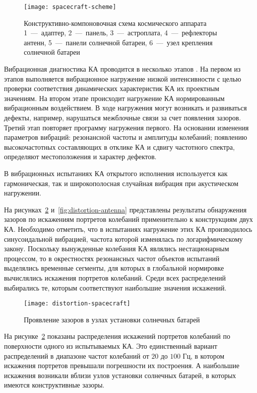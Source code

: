 \begin{figure}[H]
	\centerfloat
	\texttt{[image: spacecraft-scheme]}
	\caption{Конструктивно-компоновочная схема космического аппарата \\ 1~---~адаптер, 2~---~панель, 3~---~астроплата, 4~---~рефлекторы антенн, 5~---~панели солнечной батареи, 6~---~узел крепления солнечной батареи} \label{fig:spacecraft-scheme}
\end{figure}

Вибрационная диагностика КА проводится в несколько этапов \cite{lib:defects:Berns:experience}. На первом из этапов выполняется вибрационное нагружение низкой интенсивности с целью проверки соответствия динамических характеристик КА их проектным значениям. На втором этапе происходит нагружение КА нормированным вибрационным воздействием. В ходе нагружения могут возникать и развиваться дефекты, например, нарушаться межблочные связи за счет появления зазоров. Третий этап повторяет программу нагружения первого. На основании изменения параметров вибраций: резонансной частоты и амплитуды колебаний; появлению высокочастотных составляющих в отклике КА и сдвигу частотного спектра, определяют местоположения и характер дефектов.

В вибрационных испытаниях КА открытого исполнения используется как гармоническая, так и широкополосная случайная вибрация при акустическом нагружении.

На рисунках~\ref{fig:distortion-spacecraft} и~\ref{fig:distortion-antenna} представлены результаты обнаружения зазоров по искажениям портретов колебаний применительно к конструкциям двух КА. Необходимо отметить, что в испытаниях нагружение этих КА производилось синусоидальной вибрацией, частота которой изменялась по логарифмическому закону. Поскольку вынужденные колебания КА являлись нестационарным процессом, то в окрестностях резонансных частот объектов испытаний выделялись временные сегменты, для которых в глобальной нормировке вычислялись искажения портретов колебаний. Среди всех распределений выбирались те, которым соответствуют наибольшие значения искажений. 

\begin{figure}[H]
	\centerfloat
	\texttt{[image: distortion-spacecraft]}
	\caption{Проявление зазоров в узлах установки солнечных батарей} \label{fig:distortion-spacecraft}
\end{figure}

На рисунке~\ref{fig:distortion-spacecraft} показаны распределения искажений портретов колебаний по поверхности одного из испытываемых КА. Это единственный вариант распределений в диапазоне частот колебаний от $ 20 $ до $ 100 $ Гц, в котором искажения портретов превышали погрешности их построения. А наибольшие искажения возникали вблизи узлов установки солнечных батарей, в которых имеются конструктивные зазоры. 


